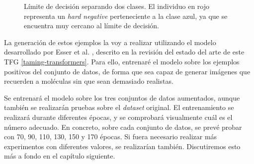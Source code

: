 \begin{figure}[H]
\centering
    \caption{Límite de decisión separando dos clases. El individuo en rojo representa un \textit{hard negative} perteneciente a la clase azul, ya que se encuentra muy cercano al límite de decisión.} 
\end{figure}

La generación de estos ejemplos la voy a realizar utilizando el modelo desarrollado por Esser et al. \cite{esser2021taming}, descrito en la revisión del estado del arte de este TFG \ref{taming-transformers}. Para ello, entrenaré el modelo sobre los ejemplos positivos del conjunto de datos, de forma que sea capaz de generar imágenes que recuerden a moléculas sin que sean demasiado realistas. 

Se entrenará el modelo sobre los tres conjuntos de datos aumentados, aunque también se realizarán pruebas sobre el \textit{dataset} original. El entrenamiento se realizará durante diferentes épocas, y se comprobará visualmente cuál es el número adecuado. En concreto, sobre cada conjunto de datos, se prevé probar con 70, 90, 110, 130, 150 y 170 épocas. Si fuera necesario realizar más experimentos con diferentes valores, se realizarían también. Discutiremos esto más a fondo en el capítulo siguiente.

